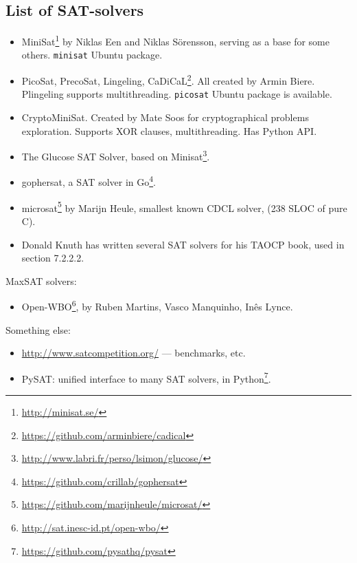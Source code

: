 \subsection{List of SAT-solvers}


\begin{itemize}

\item MiniSat\footnote{\url{http://minisat.se/}} by Niklas Een and Niklas Sörensson, serving as a base for some others.
\verb|minisat| Ubuntu package.

\item PicoSat, PrecoSat, Lingeling, CaDiCaL\footnote{\url{https://github.com/arminbiere/cadical}}.
All created by Armin Biere. Plingeling supports multithreading.
\verb|picosat| Ubuntu package is available.

\item CryptoMiniSat. Created by Mate Soos for cryptographical problems exploration.
Supports XOR clauses, multithreading.
Has Python API.

\item The Glucose SAT Solver, based on Minisat\footnote{\url{http://www.labri.fr/perso/lsimon/glucose/}}.

\item gophersat, a SAT solver in Go\footnote{\url{https://github.com/crillab/gophersat}}.

\item microsat\footnote{\url{https://github.com/marijnheule/microsat/}} by Marijn Heule, smallest known CDCL solver, (238 SLOC of pure C).

\item Donald Knuth has written several SAT solvers for his TAOCP book, used in section 7.2.2.2.

\end{itemize}

MaxSAT solvers:

\begin{itemize}

\item Open-WBO\footnote{\url{http://sat.inesc-id.pt/open-wbo/}}, by Ruben Martins, Vasco Manquinho, Inês Lynce.

\end{itemize}

Something else:

\begin{itemize}

\item \url{http://www.satcompetition.org/} --- benchmarks, etc.

\item PySAT: unified interface to many SAT solvers, in Python\footnote{\url{https://github.com/pysathq/pysat}}.

\end{itemize}

